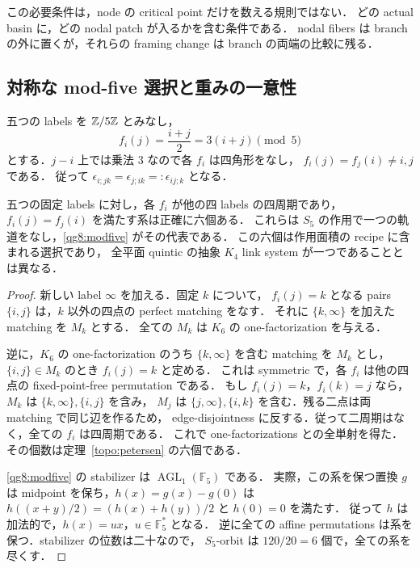 この必要条件は，node の critical point だけを数える規則ではない．
どの actual basin に，どの nodal patch が入るかを含む条件である．
nodal fibers は branch の外に置くが，それらの framing change は branch の両端の比較に残る．

\subsection{対称な mod-five 選択と重みの一意性}

五つの labels を $\mathbb Z/5\mathbb Z$ とみなし，
\begin{equation}\label{qg8:modfive}
 f_i(j)=\frac{i+j}{2}=3(i+j)\pmod5
\end{equation}
とする．$j-i$ 上では乗法 $3$ なので各 $f_i$ は四角形をなし，
$f_i(j)=f_j(i)\ne i,j$ である．
従って $\epsilon_{i;jk}=\epsilon_{j;ik}=:\epsilon_{ij;k}$ となる．

\begin{corollary}[対称な有向四角形系は六つ]\label{qg8:six-systems}
五つの固定 labels に対し，各 $f_i$ が他の四 labels の四周期であり，
$f_i(j)=f_j(i)$ を満たす系は正確に六個ある．
これらは $S_5$ の作用で一つの軌道をなし，\eqref{qg8:modfive} がその代表である．
この六個は作用面積の recipe に含まれる選択であり，
全平面 quintic の抽象 $K_4$ link system が一つであることとは異なる．
\end{corollary}

\begin{proof}
新しい label $\infty$ を加える．固定 $k$ について，
$f_i(j)=k$ となる pairs $\{i,j\}$ は，$k$ 以外の四点の perfect matching をなす．
それに $\{k,\infty\}$ を加えた matching を $M_k$ とする．
全ての $M_k$ は $K_6$ の one-factorization を与える．

逆に，$K_6$ の one-factorization のうち $\{k,\infty\}$ を含む matching を $M_k$ とし，
$\{i,j\}\in M_k$ のとき $f_i(j)=k$ と定める．
これは symmetric で，各 $f_i$ は他の四点の fixed-point-free permutation である．
もし $f_i(j)=k$，$f_i(k)=j$ なら，$M_k$ は $\{k,\infty\},\{i,j\}$ を含み，
$M_j$ は $\{j,\infty\},\{i,k\}$ を含む．残る二点は両 matching で同じ辺を作るため，
edge-disjointness に反する．従って二周期はなく，全ての $f_i$ は四周期である．
これで one-factorizations との全単射を得た．その個数は定理~\ref{topo:petersen} の六個である．

\eqref{qg8:modfive} の stabilizer は $\operatorname{AGL}_1(\mathbb F_5)$ である．
実際，この系を保つ置換 $g$ は midpoint を保ち，$h(x)=g(x)-g(0)$ は
$h((x+y)/2)=(h(x)+h(y))/2$ と $h(0)=0$ を満たす．
従って $h$ は加法的で，$h(x)=ux$，$u\in\mathbb F_5^*$ となる．
逆に全ての affine permutations は系を保つ．stabilizer の位数は二十なので，
$S_5$-orbit は $120/20=6$ 個で，全ての系を尽くす．
\end{proof}

